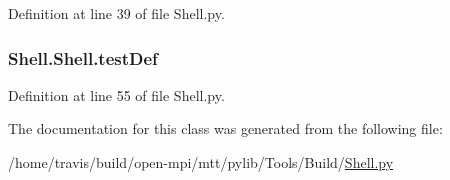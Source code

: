 Definition at line 39 of file Shell.\-py.

\hypertarget{classShell_1_1Shell_ac2533422279cd3b3d3bc43e8b3de1301}{
\subsubsection[{test\-Def}]{\setlength{\rightskip}{0pt plus 5cm}Shell.\-Shell.\-test\-Def}}\label{classShell_1_1Shell_ac2533422279cd3b3d3bc43e8b3de1301}


Definition at line 55 of file Shell.\-py.



The documentation for this class was generated from the following file\-:\begin{DoxyCompactItemize}
\item 
/home/travis/build/open-\/mpi/mtt/pylib/\-Tools/\-Build/\hyperlink{Shell_8py}{Shell.\-py}\end{DoxyCompactItemize}
